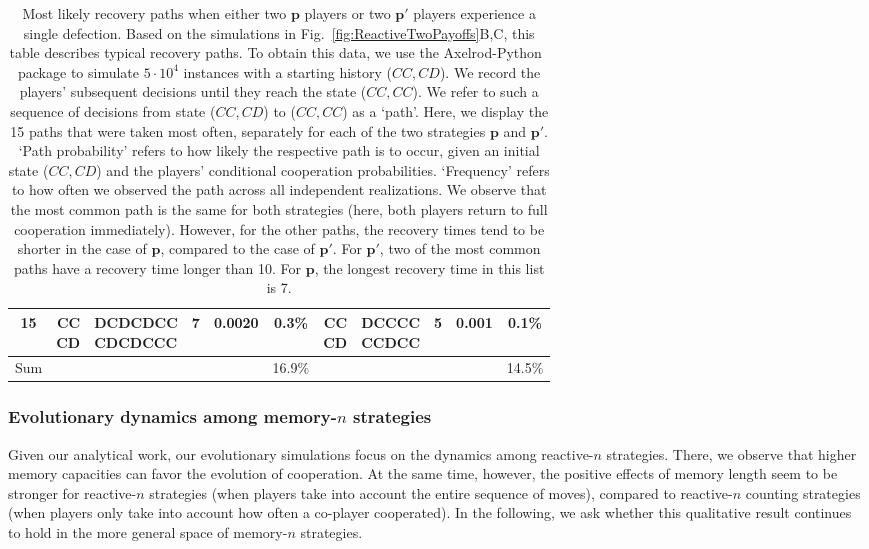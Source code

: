 \documentclass[9pt,twoside,lineno]{pnas-new}
\theoremstyle{plainCl1}
\theoremstyle{plainCl2}
\begin{document}
\begin{table}[t]
{\begin{tabular}{c|rlccc|rlccc}
    15 &  \cellcolor{gray!25} \makecell[r]{CC \\ CD} & \makecell[l]{DCDCDCC \\  CDCDCCC} &  7 &  0.0020 & 0.3\%  &   \cellcolor{gray!25} \makecell[r]{CC \\ CD} & \makecell[l]{        DCCCC \\         CCDCC} &   5 &   0.001 & 0.1\% \\  \hline
    Sum & & &  &  & 16.9\% & & & &  & 14.5\% \\
    \bottomrule
    \end{tabular}}
    \caption{Most likely recovery paths when either two $\mathbf{p}$ players or two $\mathbf{p'}$ players experience a single defection.
    {\normalfont Based on the simulations in Fig.~\ref{fig:ReactiveTwoPayoffs}B,C, this table describes typical recovery paths. 
    To obtain this data, we use the Axelrod-Python~\cite{AxelrodPython} package to simulate $5\!\cdot\!10^4$ instances with a starting history ($CC,CD$). 
    We record the players' subsequent decisions until they reach the state ($CC,CC$). 
    We refer to such a sequence of decisions from state ($CC,CD$) to ($CC,CC$) as a `path'. 
    Here, we display the 15 paths that were taken most often, separately for each of the two strategies $\mathbf{p}$ and $\mathbf{p'}$. 
    `Path probability' refers to how likely the respective path is to occur, given an initial state ($CC,CD$) and the players' conditional cooperation probabilities. 
    `Frequency' refers to how often we observed the path across all independent realizations. 
    We observe that the most common path is the same for both strategies (here, both players return to full cooperation immediately). 
    However, for the other paths, the recovery times tend to be shorter in the case of \(\mathbf{p}\), compared to the case of \(\mathbf{p'}\).
    For \(\mathbf{p'}\), two of the most common paths have a recovery time longer than 10. 
    For \(\mathbf{p}\), the longest recovery time in this list is 7.}}
    \label{Tab:Recovery}
\end{table}




\subsubsection*{Evolutionary dynamics among memory-$n$ strategies}

Given our analytical work, our evolutionary simulations focus on the dynamics among reactive-$n$ strategies. 
There, we observe that higher memory capacities can favor the evolution of cooperation. 
At the same time, however, the positive effects of memory length seem to be stronger for reactive-$n$ strategies (when players take into account the entire sequence of moves), compared to reactive-$n$ counting strategies (when players only take into account how often a co-player cooperated).
In the following, we ask whether this qualitative result continues to hold in the more general space of memory-$n$ strategies. 
\end{document}

